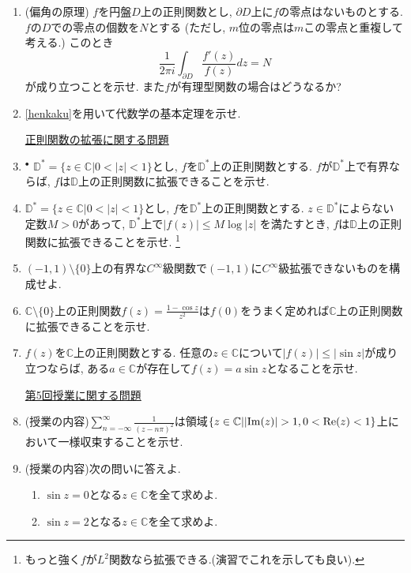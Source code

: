 \documentclass[dvipdfmx,a4paper,11pt]{article}
\newcommand{\C}{\mathbb{C}}
\newcommand{\D}{\mathbb{D}}
\theoremstyle{definition}
\begin{document}
\begin{enumerate}[label=\textbf{問}4.\arabic*]
  \item \label{henkaku} (偏角の原理) $f$を円盤$D$上の正則関数とし, $\partial D$上に$f$の零点はないものとする. 
  $f$の$D$での零点の個数を$N$とする (ただし, $m$位の零点は$m$この零点と重複して考える.)
  このとき
  $$
  \frac{1}{2 \pi i} \int_{\partial D} \frac{f' (z)}{f(z)} dz = N
  $$
  が成り立つことを示せ. また$f$が有理型関数の場合はどうなるか?
  \item \ref{henkaku}を用いて代数学の基本定理を示せ.
  
\vspace{12pt}
\hspace{-36pt}\underline{正則関数の拡張に関する問題}



 \item $^{\bullet}$  $\D^{*}=\{z \in \C | 0 < |z| <1\}$とし, $f$を$\D^{*}$上の正則関数とする. 
 $f$が$\D^{*}$上で有界ならば, $f$は$\D$上の正則関数に拡張できることを示せ. 
 
  \item $\D^{*}=\{z \in \C | 0 < |z| <1\}$とし, $f$を$\D^{*}$上の正則関数とする. 
 $z \in \D^{*}$によらない定数$M>0$があって, $\D^{*}$上で$|f(z)| \le M \log |z|$
 を満たすとき, $f$は$\D$上の正則関数に拡張できることを示せ. \footnote{もっと強く$f$が$L^2$関数なら拡張できる.(演習でこれを示しても良い).}
 
 
 \item $(-1,1) \setminus \{ 0\}$上の有界な$C^{\infty}$級関数で$(-1,1)$に$C^{\infty}$級拡張できないものを構成せよ. 
 
  \item $\C \setminus \{ 0\}$上の正則関数$f(z)=\frac{1 - \cos z}{z^2}$は$f(0)$をうまく定めれば$\C$上の正則関数に拡張できることを示せ. 
  
 \item $f(z)$を$\C$上の正則関数とする. 任意の$z \in \C$について$|f(z)| \le |\sin z|$が成り立つならば, ある$a \in \C$が存在して$f(z) = a \sin z$となることを示せ. 
 


      
 \vspace{12pt}
\hspace{-36pt}\underline{第5回授業に関する問題}     
  \item (授業の内容)$\sum_{n= - \infty}^{\infty} \frac{1}{(z - n \pi)^2}$は領域$\{ z \in \C | |{\rm Im}(z)| >1, 0 < {\rm Re}(z) < 1\}$上において一様収束することを示せ.

 \item  (授業の内容)次の問いに答えよ.
  \begin{enumerate}
\setlength{\parskip}{0cm} 
  \setlength{\itemsep}{0cm} 
\item $\sin z =0$となる$z \in \C$を全て求めよ. 
\item $\sin z =2$となる$z \in \C$を全て求めよ. 
   \end{enumerate}
   

\end{enumerate}
\end{document}
